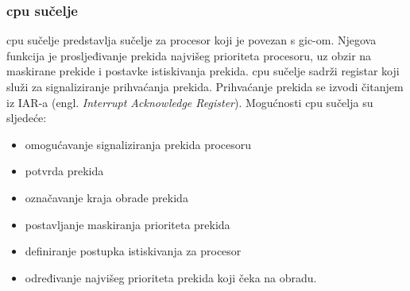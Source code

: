 \documentclass[times, utf8, diplomski, numeric]{fer}
\begin{document}
\subsubsection{\gls{cpu} sučelje}
\gls{cpu} sučelje predstavlja sučelje za procesor koji je povezan s \gls{gic}-om. Njegova funkcija je prosljeđivanje prekida najvišeg
prioriteta procesoru, uz obzir na maskirane prekide i postavke istiskivanja prekida. \gls{cpu} sučelje sadrži registar koji
služi za signaliziranje prihvaćanja prekida. Prihvaćanje prekida se izvodi čitanjem iz IAR-a (engl. \textit{Interrupt
Acknowledge Register}). Mogućnosti \gls{cpu} sučelja su sljedeće:
\begin{itemize}
  \item{omogućavanje signaliziranja prekida procesoru}
  \item{potvrda prekida}
  \item{označavanje kraja obrade prekida}
  \item{postavljanje maskiranja prioriteta prekida}
  \item{definiranje postupka istiskivanja za procesor}
  \item{određivanje najvišeg prioriteta prekida koji čeka na obradu.}
\end{itemize}
\end{document}
